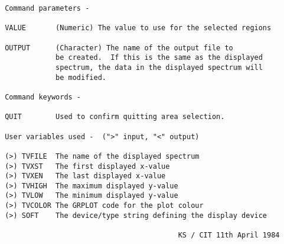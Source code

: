 \begin{description}
\begin{verbatim}
 Command parameters -

 VALUE       (Numeric) The value to use for the selected regions

 OUTPUT      (Character) The name of the output file to
             be created.  If this is the same as the displayed
             spectrum, the data in the displayed spectrum will
             be modified.

 Command keywords -

 QUIT        Used to confirm quitting area selection.

 User variables used -  (">" input, "<" output)

 (>) TVFILE  The name of the displayed spectrum
 (>) TVXST   The first displayed x-value
 (>) TVXEN   The last displayed x-value
 (>) TVHIGH  The maximum displayed y-value
 (>) TVLOW   The minimum displayed y-value
 (>) TVCOLOR The GRPLOT code for the plot colour
 (>) SOFT    The device/type string defining the display device

                                          KS / CIT 11th April 1984
\end{verbatim}
\end{description}

